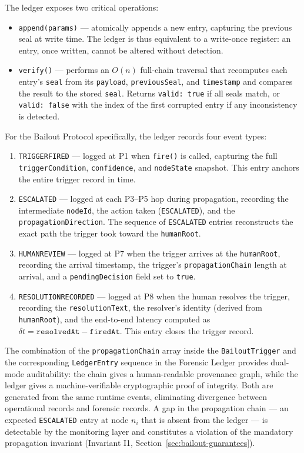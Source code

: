The ledger exposes two critical operations:

\begin{itemize}
  \item \texttt{append(params)} --- atomically appends a new entry, capturing the previous seal at write time. The ledger is thus equivalent to a write-once register: an entry, once written, cannot be altered without detection.
  \item \texttt{verify()} --- performs an $O(n)$ full-chain traversal that recomputes each entry's \texttt{seal} from its \texttt{payload}, \texttt{previousSeal}, and \texttt{timestamp} and compares the result to the stored \texttt{seal}. Returns \texttt{valid:\ true} if all seals match, or \texttt{valid:\ false} with the index of the first corrupted entry if any inconsistency is detected.
\end{itemize}

For the Bailout Protocol specifically, the ledger records four event types:

\begin{enumerate}
  \item \texttt{TRIGGER\textunderscore FIRED} --- logged at P1 when \texttt{fire()} is called, capturing the full \texttt{triggerCondition}, \texttt{confidence}, and \texttt{nodeState} snapshot. This entry anchors the entire trigger record in time.
  \item \texttt{ESCALATED} --- logged at each P3--P5 hop during propagation, recording the intermediate \texttt{nodeId}, the action taken (\texttt{ESCALATED}), and the \texttt{propagationDirection}. The sequence of \texttt{ESCALATED} entries reconstructs the exact path the trigger took toward the \texttt{humanRoot}.
  \item \texttt{HUMAN\textunderscore REVIEW} --- logged at P7 when the trigger arrives at the \texttt{humanRoot}, recording the arrival timestamp, the trigger's \texttt{propagationChain} length at arrival, and a \texttt{pendingDecision} field set to \texttt{true}.
  \item \texttt{RESOLUTION\textunderscore RECORDED} --- logged at P8 when the human resolves the trigger, recording the \texttt{resolutionText}, the resolver's identity (derived from \texttt{humanRoot}), and the end-to-end latency computed as $\delta t = \texttt{resolvedAt} - \texttt{firedAt}$. This entry closes the trigger record.
\end{enumerate}

The combination of the \texttt{propagationChain} array inside the \texttt{BailoutTrigger} and the corresponding \texttt{LedgerEntry} sequence in the Forensic Ledger provides dual-mode auditability: the chain gives a human-readable provenance graph, while the ledger gives a machine-verifiable cryptographic proof of integrity. Both are generated from the same runtime events, eliminating divergence between operational records and forensic records. A gap in the propagation chain --- an expected \texttt{ESCALATED} entry at node $n_i$ that is absent from the ledger --- is detectable by the monitoring layer and constitutes a violation of the mandatory propagation invariant (Invariant I1, Section~\ref{sec:bailout-guarantees}).


